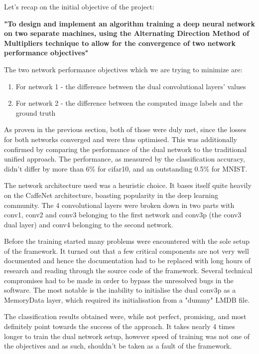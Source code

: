 \documentclass[letterpaper]{article}
\begin{document}
Let's recap on the initial objective of the project:

\textbf{"To design and implement an algorithm training a deep neural network on two separate machines, using the Alternating Direction Method of Multipliers technique to allow for the convergence of two network performance objectives"}

The two network performance objectives which we are trying to minimize are:
\begin{enumerate}
	\item For network 1 - the difference between the dual convolutional layers' values
	\item For network 2 - the difference between the computed image labels and the ground truth
\end{enumerate}

As proven in the previous section, both of those were duly met, since the losses for both networks converged and were thus optimised. This was additionally confirmed by comparing the performance of the dual network to the traditional unified approach. The performance, as measured by the classification accuracy, didn't differ by more than 6\% for cifar10, and an outstanding 0.5\% for MNIST.

The network architecture used was a heuristic choice. It bases itself quite heavily on the CaffeNet architecture, boasting popularity in the deep learning community. The 4 convolutional layers were broken down in two parts with conv1, conv2 and conv3 belonging to the first network and conv3p (the conv3 dual layer) and conv4 belonging to the second network.

Before the training started many problems were encountered with the sole setup of the framework. It turned out that a few critical components are not very well documented and hence the documentation had to be replaced with long hours of research and reading through the source code of the framework. Several technical compromises had to be made in order to bypass the unresolved bugs in the software. The most notable is the inability to initialise the dual conv3p as a MemoryData layer, which required its initialisation from a "dummy" LMDB file.

The classification results obtained were, while not perfect, promising, and most definitely point towards the success of the approach. It takes nearly 4 times longer to train the dual network setup, however speed of training was not one of the objectives and as such, shouldn't be taken as a fault of the framework.
\end{document}
